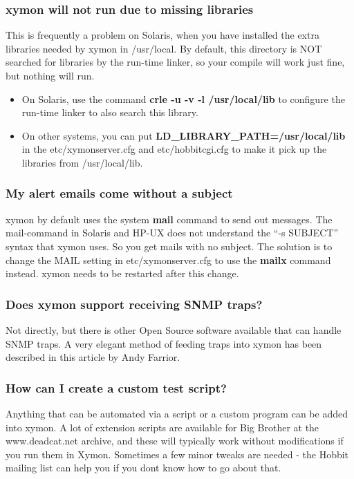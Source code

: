 \subsubsection{xymon will not run due to missing libraries}


 This is frequently a problem on Solaris, when you have installed the extra libraries needed by xymon in /usr/local. By default, this directory is NOT searched for libraries by the run-time linker, so your compile will work just fine, but nothing will run. \begin{itemize}
\item On Solaris, use the command \textbf{crle -u -v -l /usr/local/lib}
 to configure the run-time linker to also search this library.
\item On other systems, you can put \textbf{LD\_LIBRARY\_PATH=/usr/local/lib}
 in the etc/xymonserver.cfg and etc/hobbitcgi.cfg to make it pick up the libraries from /usr/local/lib.

\end{itemize}

 
\subsubsection{My alert emails come without a subject}


 xymon by default uses the system \textbf{mail}
 command to send out messages. The mail-command in Solaris and HP-UX does not understand the ``-s SUBJECT'' syntax that xymon uses. So you get mails with no subject. The solution is to change the MAIL setting in etc/xymonserver.cfg to use the \textbf{mailx}
 command instead. xymon needs to be restarted after this change.
 
\subsubsection{Does xymon support receiving SNMP traps?}


 Not directly, but there is other Open Source software available that can handle SNMP traps. A very elegant method of feeding traps into xymon has been described in this article by Andy Farrior.
 
\subsubsection{How can I create a custom test script?}


 Anything that can be automated via a script or a custom program can be added into xymon. A lot of extension scripts are available for Big Brother at the www.deadcat.net archive, and these will typically work without modifications if you run them in Xymon. Sometimes a few minor tweaks are needed - the Hobbit mailing list can help you if you dont know how to go about that.


